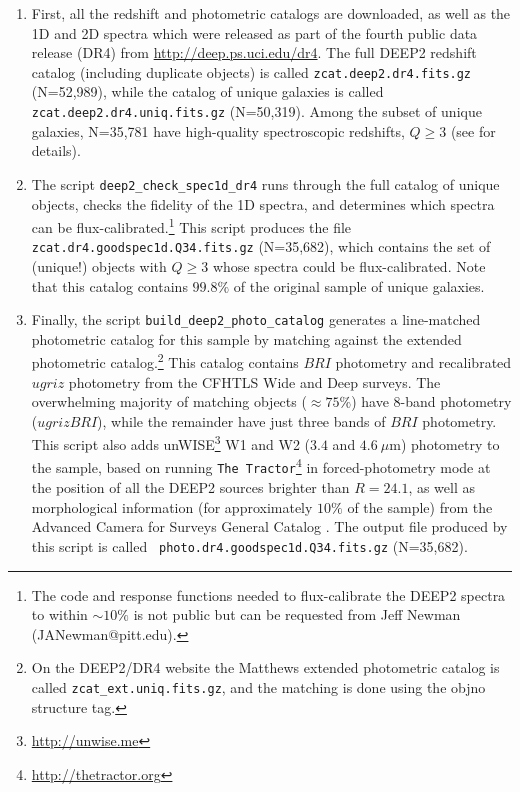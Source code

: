 \documentclass[12pt]{article}
\begin{document}
\begin{enumerate}
\item{First, all the redshift and photometric catalogs are downloaded,
  as well as the 1D and 2D spectra which were released as part of the
  fourth public data release (DR4) from
  \url{http://deep.ps.uci.edu/dr4}.  The full DEEP2 redshift catalog
  (including duplicate objects) is called {\tt zcat.deep2.dr4.fits.gz}
  (N=52,989), while the catalog of unique galaxies is called {\tt
    zcat.deep2.dr4.uniq.fits.gz} (N=50,319).  Among the subset of
  unique galaxies, N=35,781 have high-quality spectroscopic redshifts,
  $Q\ge3$ (see \citealt{newman13a} for details).}
\item{The script {\tt deep2\_check\_spec1d\_dr4} runs through the full
  catalog of unique objects, checks the fidelity of the 1D spectra,
  and determines which spectra can be flux-calibrated.\footnote{The
    code and response functions needed to flux-calibrate the DEEP2
    spectra to within $\sim10\%$ is not public but can be requested
    from Jeff Newman (JANewman@pitt.edu).}  This script produces the
  file {\tt zcat.dr4.goodspec1d.Q34.fits.gz} (N=35,682), which
  contains the set of (unique!) objects with $Q\ge3$ whose spectra
  could be flux-calibrated.  Note that this catalog contains $99.8\%$
  of the original sample of unique galaxies.}
\item{Finally, the script {\tt build\_deep2\_photo\_catalog} generates
  a line-matched photometric catalog for this sample by matching
  against the \citet{matthews13a} extended photometric
  catalog.\footnote{On the DEEP2/DR4 website the Matthews extended
    photometric catalog is called {\tt zcat\_ext.uniq.fits.gz}, and
    the matching is done using the {\sc objno} structure tag.}  This
  catalog contains $BRI$ photometry and recalibrated $ugriz$
  photometry from the CFHTLS Wide and Deep surveys.  The overwhelming
  majority of matching objects ($\approx75\%$) have 8-band photometry
  ($ugrizBRI$), while the remainder have just three bands of $BRI$
  photometry.  This script also adds
  unWISE\footnote{\url{http://unwise.me}} W1 and W2 ($3.4$ and
  $4.6~\mu$m) photometry to the sample, based on running {\tt The
    Tractor}\footnote{\url{http://thetractor.org}} in
  forced-photometry mode at the position of all the DEEP2 sources
  brighter than $R=24.1$, as well as morphological information (for
  approximately $10\%$ of the sample) from the Advanced Camera for
  Surveys General Catalog \citep[ACS-GC;][]{griffith12a}.  The output
  file produced by this script is called {\tt
    photo.dr4.goodspec1d.Q34.fits.gz} (N=35,682).}
\end{enumerate}
\end{document}
